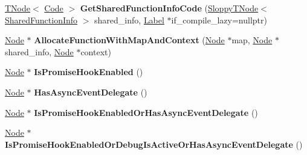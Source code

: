 \begin{DoxyCompactItemize}
\mbox{\hyperlink{classv8_1_1internal_1_1compiler_1_1TNode}{T\+Node}}$<$ \mbox{\hyperlink{classv8_1_1internal_1_1Code}{Code}} $>$ {\bfseries Get\+Shared\+Function\+Info\+Code} (\mbox{\hyperlink{classv8_1_1internal_1_1compiler_1_1SloppyTNode}{Sloppy\+T\+Node}}$<$ \mbox{\hyperlink{classv8_1_1internal_1_1SharedFunctionInfo}{Shared\+Function\+Info}} $>$ shared\+\_\+info, \mbox{\hyperlink{classv8_1_1internal_1_1compiler_1_1CodeAssemblerLabel}{Label}} $\ast$if\+\_\+compile\+\_\+lazy=nullptr)
\item 
\mbox{\label{classv8_1_1internal_1_1CodeStubAssembler_acd1062c1a5ca8582e543934c0ebea8fa}} 
\mbox{\hyperlink{classv8_1_1internal_1_1compiler_1_1Node}{Node}} $\ast$ {\bfseries Allocate\+Function\+With\+Map\+And\+Context} (\mbox{\hyperlink{classv8_1_1internal_1_1compiler_1_1Node}{Node}} $\ast$map, \mbox{\hyperlink{classv8_1_1internal_1_1compiler_1_1Node}{Node}} $\ast$shared\+\_\+info, \mbox{\hyperlink{classv8_1_1internal_1_1compiler_1_1Node}{Node}} $\ast$context)
\item 
\mbox{\label{classv8_1_1internal_1_1CodeStubAssembler_a51da5380d1e25b666de7a2673bcdd9a3}} 
\mbox{\hyperlink{classv8_1_1internal_1_1compiler_1_1Node}{Node}} $\ast$ {\bfseries Is\+Promise\+Hook\+Enabled} ()
\item 
\mbox{\label{classv8_1_1internal_1_1CodeStubAssembler_a0074ad38d3cb4088cf1407166211f251}} 
\mbox{\hyperlink{classv8_1_1internal_1_1compiler_1_1Node}{Node}} $\ast$ {\bfseries Has\+Async\+Event\+Delegate} ()
\item 
\mbox{\label{classv8_1_1internal_1_1CodeStubAssembler_a2f4d7a4a16d1d0eae057a27eced56750}} 
\mbox{\hyperlink{classv8_1_1internal_1_1compiler_1_1Node}{Node}} $\ast$ {\bfseries Is\+Promise\+Hook\+Enabled\+Or\+Has\+Async\+Event\+Delegate} ()
\item 
\mbox{\label{classv8_1_1internal_1_1CodeStubAssembler_ad7c3198bd3e55e5fb14a81fcaa802dd0}} 
\mbox{\hyperlink{classv8_1_1internal_1_1compiler_1_1Node}{Node}} $\ast$ {\bfseries Is\+Promise\+Hook\+Enabled\+Or\+Debug\+Is\+Active\+Or\+Has\+Async\+Event\+Delegate} ()
\item 
\mbox{\label{classv8_1_1internal_1_1CodeStubAssembler_ae7da2acee53176f8e6d640023783bcdb}} 

\end{DoxyCompactItemize}
